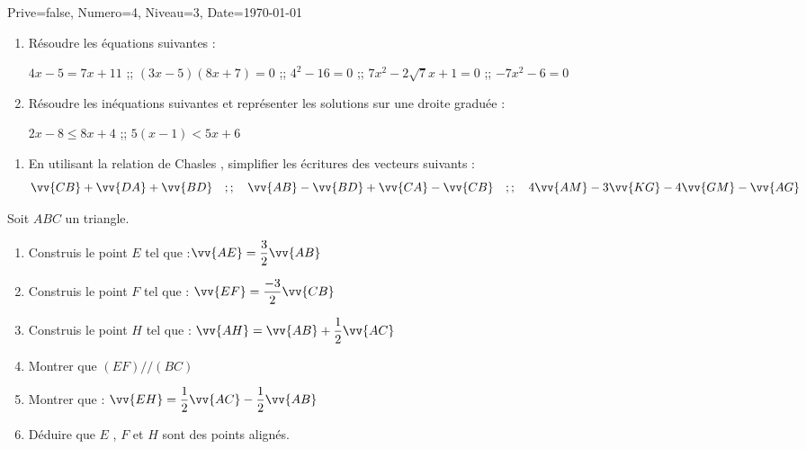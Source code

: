\documentclass[a4paper,12pt]{article}
\begin{document}
\begin{Maquette}[DM]{Prive=false, Numero=4, Niveau=3, Date=\today}

\begin{exercice}
\begin{enumerate}
\item Résoudre les équations suivantes :

$4x-5=7x+11$ ;; $(3x-5)(8x+7)=0$ ;; $4^{2}-16=0$ ;; $7x^{2}-2\sqrt{7}x+1=0$ ;; $-7x^{2}-6=0$
\item Résoudre les inéquations suivantes et représenter les solutions sur une droite graduée :

$2x-8\leq 8x+4$ ;; $5(x-1)< 5x+6$
\end{enumerate}
\end{exercice}

\begin{exercice}
\begin{enumerate}
\item En utilisant la relation de Chasles , simplifier les écritures des vecteurs suivants :
\[
\vv{CB}+\vv{DA}+\vv{BD}\quad ;;\quad
 \vv{AB}-\vv{BD}+\vv{CA}-\vv{CB}\quad ;;\quad
 4\vv{AM}-3\vv{KG}-4\vv{GM}-\vv{AG}
\]
\end{enumerate}
\end{exercice}

\begin{exercice}
Soit $ABC$ un triangle.
\begin{enumerate}
\item Construis le point $E$ tel que :$\vv{AE}=\dfrac{3}{2}\vv{AB}$
\item Construis le point $F$ tel que : $\vv{EF}=\dfrac{-3}{2}\vv{CB}$
\item Construis le point $H$ tel que : $\vv{AH}=\vv{AB}+\dfrac{1}{2}\vv{AC}$
\item Montrer que $(EF)//(BC)$
\item Montrer que : $\vv{EH}=\dfrac{1}{2}\vv{AC}-\dfrac{1}{2}\vv{AB}$
\item Déduire que $E$ , $F$ et $H$ sont des points alignés.
\end{enumerate}
\end{exercice}



\end{Maquette}
\end{document}
